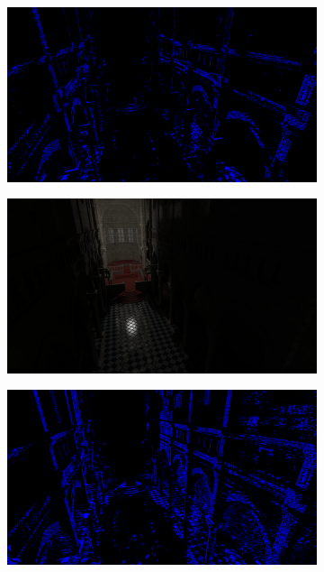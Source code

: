 \begin{figure}[H]
\begin{subfigure}[b]{.49\linewidth}
	\end{subfigure}%
	\hspace{0.01\textwidth}
	\begin{subfigure}[b]{.49\linewidth}
		\centering
		\captionsetup{justification=centering}
		\includegraphics[width=\linewidth]{media/finals/sibenik_gi_128_diff.png}
	\end{subfigure}%
	\par\smallskip
	\begin{subfigure}[b]{.49\linewidth}
		\centering
		\captionsetup{justification=centering}
		\includegraphics[width=\linewidth]{media/finals/sibenik_gi_64.png}
	\end{subfigure}%
	\hspace{0.01\textwidth}
	\begin{subfigure}[b]{.49\linewidth}
		\centering
		\captionsetup{justification=centering}
		\includegraphics[width=\linewidth]{media/finals/sibenik_gi_64_diff.png}

\end{subfigure}
\end{figure}
